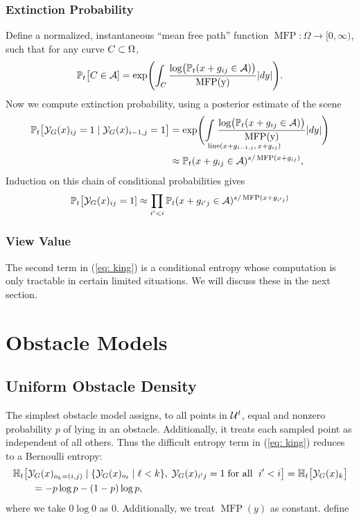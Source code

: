 \subsubsection{Extinction Probability}
Define a normalized, instantaneous ``mean free path'' function 
$\operatorname{MFP}:\Omega\to[0,\infty)$, such that 
for any curve $C\subset\Omega$,
$$
\mathbb{P}_t\bigl[C\in\mathcal{A}] = \exp\Biggl(\int_C
\frac{\log\bigl(\mathbb{P}_t(x+g_{ij}\in\mathcal{A})\bigr)}{\operatorname{MFP(y)}}|dy|\Biggr).
$$
Now we compute extinction probability, using a posterior estimate of the scene
\begin{align*}
\PP_t\bigl[\Y_G(x)_{ij}=1 \;|\; \Y_G(x)_{i-1,j}=1\big] 
&= \exp\Biggl(\underset{\!\!\!\mathrlap{\text{line}(x+g_{i-1,j},\,x+g_{ij})}}{\int}\; 
\frac{\log\bigl(\PP_t(x+g_{ij}\in\A)\bigr)}{\operatorname{MFP(y)}}|dy|\Biggr)\\
&\approx \PP_t(x+g_{ij}\in\A)^{s/\operatorname{MFP}(x+g_{ij})},
\end{align*}
Induction on this chain of conditional probabilities gives
$$\mathbb{P}_t\bigl[\mathcal{Y}_G(x)_{ij}=1] \approx \prod_{i^{\prime}<i} \mathbb{P}_t(x+g_{i^{\prime}j}\in\mathcal{A})^{s/\operatorname{MFP}(x+g_{i^{\prime}j})}$$ 

\subsubsection{View Value}
The second term in (\ref{eq: king}) is a conditional entropy whose computation is only tractable in certain limited situations.
We will discuss these in the next section.

\section{Obstacle Models \label{section: obstacle models}}
\subsection{Uniform Obstacle Density}
The simplest obstacle model assigns, to all points in $\mathcal{U}^t$, 
equal and nonzero probability $p$ of lying in an obstacle.
Additionally, it treats each sampled point as independent of all others.
Thus the difficult entropy term in (\ref{eq: king}) reduces to a Bernoulli entropy:
\begin{align*}
&\mathbb{H}_t\bigl[\mathcal{Y}_G(x)_{o_k=(i,j)}\;|\;
\{\mathcal{Y}_G(x)_{o_{\ell}}\;|\;\ell<k\},\;
\mathcal{Y}_G(x)_{i^{\prime}j}=1\;\text{for all $\;i^{\prime}<i$}
\bigr] = \mathbb{H}_t\bigl[\mathcal{Y}_G(x)_k\bigr] \\
&\qquad=-p\log p - (1-p)\log p,
\end{align*}
where we take $0\log 0$ as 0.  Additionally, we treat $\operatorname{MFP}(y)$ as constant.
define 

